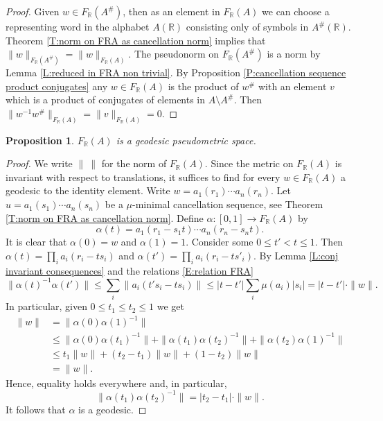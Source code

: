 \documentclass[12pt]{amsart}
\newtheorem{prop}{Proposition}[section]
\theoremstyle{definition}
\def\RR{\ensuremath{\mathbb{R}}}
\def\Free{F}
\begin{document}
\begin{proof}
Given $w \in \Free_\RR(A^\#)$, then as an element in $\Free_\RR(A)$ we can choose a representing word in the alphabet $A(\RR)$ consisting only of symbols in $A^\#(\RR)$.
Theorem \ref{T:norm on FRA as cancellation norm} implies that $\| w\|_{\Free_\RR(A^\#)}=\| w\|_{\Free_\RR(A)}$.
The pseudonorm on $\Free_\RR(A^\#)$ is a norm by Lemma \ref{L:reduced in FRA non trivial}.
By Proposition \ref{P:cancellation sequence product conjugates} any $w \in \Free_\RR(A)$ is the product of $w^\#$ with an element $v$ which is a product of conjugates of elements in $A \setminus A^\#$.
Then $\|w^{-1}w^\#\|_{\Free_\RR(A)}=\|v\|_{\Free_\RR(A)}=0$.
\end{proof}


















\begin{prop}\label{P:geodesics in F_R(A)}
$\Free_\RR(A)$ is a geodesic pseudometric space.
\end{prop}

\begin{proof}
We write $\| \ \|$ for the norm of $\Free_\RR(A)$.
Since the metric on $\Free_\RR(A)$ is invariant with respect to translations, it suffices to find for every $w \in \Free_\RR(A)$ a geodesic to the identity element.
Write $w=a_1(r_1) \cdots a_n(r_n)$.
Let $u=a_1(s_1) \cdots a_n(s_n)$ be a $\mu$-minimal cancellation sequence, see Theorem \ref{T:norm on FRA as cancellation norm}.
Define $\alpha \colon [0,1] \to F_\RR(A)$ by
\[
\alpha(t) = a_1(r_1-s_1t) \cdots a_n(r_n-s_nt).
\]
It is clear that $\alpha(0)=w$ and $\alpha(1)=1$.
Consider some $0 \leq t' < t \leq 1$.
Then $\alpha(t)=\prod_i a_i(r_i-ts_i)$ and $\alpha(t')=\prod_i a_i(r_i-ts'_i)$.
By Lemma \ref{L:conj invariant consequences} and the relations \eqref{E:relation FRA}
\[
\|\alpha(t)^{-1}\alpha(t')\| \leq \sum_i \|a_i(t's_i-ts_i)\| \leq |t-t'| \sum_i \mu(a_i)|s_i| = |t-t'| \cdot \|w\|.
\]
In particular, given $0 \leq t_1 \leq t_2 \leq 1$ we get
\begin{align*}
\|w\| &= \|\alpha(0) \alpha(1)^{-1}\| \\
&\leq \|\alpha(0) \alpha(t_1)^{-1}\| + \|\alpha(t_1)\alpha(t_2)^{-1}\|+\|\alpha(t_2)\alpha(1)^{-1}\| \\
&\leq t_1 \|w\| + (t_2-t_1)\|w\|+(1-t_2)\|w\|\\
& =\|w\|.
\end{align*}
Hence, equality holds everywhere and, in particular, 
$$
\|\alpha(t_1)\alpha(t_2)^{-1}\|=|t_2-t_1| \cdot \|w\|.
$$
It follows that $\alpha$ is a geodesic.
\end{proof}
\end{document}
